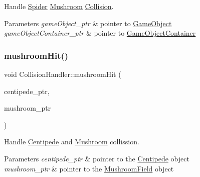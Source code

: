 Handle \mbox{\hyperlink{class_spider}{Spider}} \mbox{\hyperlink{class_mushroom}{Mushroom}} \mbox{\hyperlink{class_collision}{Collision}}. 


\begin{DoxyParams}{Parameters}
{\em game\+Object\+\_\+ptr} & pointer to \mbox{\hyperlink{class_game_object}{Game\+Object}} \\
\hline
{\em game\+Object\+Container\+\_\+ptr} & pointer to \mbox{\hyperlink{class_game_object_container}{Game\+Object\+Container}} \\
\hline
\end{DoxyParams}
\mbox{\label{class_collision_handler_ae442cd4e1b0383607873a09c2be2bf13}} 
\subsubsection{\texorpdfstring{mushroom\+Hit()}{mushroomHit()}}
{\footnotesize\ttfamily void Collision\+Handler\+::mushroom\+Hit (\begin{DoxyParamCaption}\item[{shared\+\_\+ptr$<$ \mbox{\hyperlink{class_centipede}{Centipede}} $>$}]{centipede\+\_\+ptr,  }\item[{shared\+\_\+ptr$<$ \mbox{\hyperlink{class_mushroom_field}{Mushroom\+Field}} $>$}]{mushroom\+\_\+ptr }\end{DoxyParamCaption})}



Handle \mbox{\hyperlink{class_centipede}{Centipede}} and \mbox{\hyperlink{class_mushroom}{Mushroom}} collission. 


\begin{DoxyParams}{Parameters}
{\em centipede\+\_\+ptr} & pointer to the \mbox{\hyperlink{class_centipede}{Centipede}} object \\
\hline
{\em mushroom\+\_\+ptr} & pointer to the \mbox{\hyperlink{class_mushroom_field}{Mushroom\+Field}} object \\
\hline
\end{DoxyParams}
\mbox{\label{class_collision_handler_af63977ae014e8013b2beca67ab3d22cf}} 
